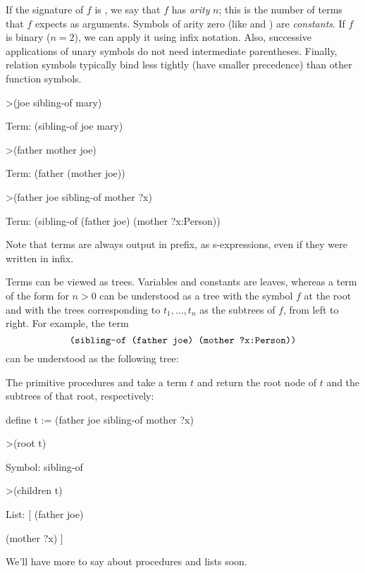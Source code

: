 If the signature of $f$ is , we say that $f$ has \emph{arity} $n$; this is the number 
of terms that $f$ expects as arguments. Symbols of arity zero (like  and ) are \emph{constants}.
If $f$ is binary ($n = 2$), we can apply it using infix notation.
Also, successive applications of unary symbols do not need intermediate parentheses. Finally, relation symbols typically
bind less tightly (have smaller precedence) than other function symbols. 
\begin{tcAthena}[upquote=true]
>(joe sibling-of mary)

Term: (sibling-of joe mary)

>(father mother joe)

Term: (father (mother joe))

>(father joe sibling-of mother ?x)

Term: (sibling-of (father joe)
                  (mother ?x:Person))
\end{tcAthena}
Note that terms are always output in prefix, as s-expressions, even if they were written in infix. 

Terms can be viewed as trees. Variables and constants are leaves, whereas a term of the form  for $n > 0$ can be understood
as a tree with the symbol $f$ at the root and with the trees corresponding to $t_1,\ldots,t_n$ as the subtrees of $f$, from left to right. For example,
the term \[\mbox{\tt (sibling-of (father joe) (mother ?x:Person))}\] can be understood as the following tree:
\begin{center}
\end{center}
The primitive procedures  and  take a term $t$ and return the root node of $t$ and the subtrees of that root,
respectively: 
\begin{tcAthena}[upquote=true]
define t := (father joe sibling-of mother ?x)

>(root t)

Symbol: sibling-of

>(children t)

List: [
(father joe)
 
(mother ?x)
]
\end{tcAthena}
We'll have more to say about procedures and lists soon. 


